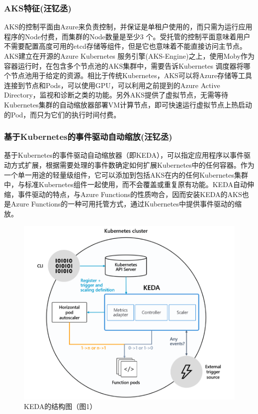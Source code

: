 \documentclass[11pt]{article}
\begin{document}
\subsubsection{AKS特征(汪钇丞)}
AKS的控制平面由Azure来负责控制，并保证是单租户使用的，而只需为运行应用程序的Node付费，而集群的Node数量是至少3 个。受托管的控制平面意味着用户不需要配置高度可用的etcd存储等组件，但是它也意味着不能直接访问主节点。AKS建立在开源的Azure Kubernetes 服务引擎(AKS-Engine)之上，使用Moby作为容器运行时，在包含多个节点池的AKS集群中，需要告诉Kubernetes 调度器将哪个节点池用于给定的资源。相比于传统Kubernetes，AKS可以将Azure存储等工具连接到节点和Pods，可以使用GPU，可以利用之前提到的Azure Active Directory，监视和诊断之类的功能。另外AKS提供了虚拟节点，无需等待Kubernetes集群的自动缩放器部署VM计算节点，即可快速运行虚拟节点上热启动的Pod，而只为它们的执行时间付费。
\subsubsection{基于Kubernetes的事件驱动自动缩放(汪钇丞)}
基于Kubernetes的事件驱动自动缩放器（即KEDA），可以指定应用程序以事件驱动方式扩展，根据需要处理的事件数确定如何扩展Kubernetes中的任何容器。作为一个单一用途的轻量级组件，它可以添加到包括AKS在内的任何Kubernetes集群中，与标准Kubernetes组件一起使用，而不会覆盖或重复原有功能。KEDA自动伸缩，事件驱动的特点，与Azure Functions的性质吻合，因而安装KEDA的AKS也是Azure Functions的一种可用托管方式，通过Kubernetes中提供事件驱动的缩放。
\begin{figure}[!htbp]
	\centering
	\includegraphics[scale=0.5]{figs/KEDA.PNG}
	\caption{KEDA的结构图（\cite{Kubernetes}图1）}
	\label{figs:KEDA}
\end{figure}
\end{document}
